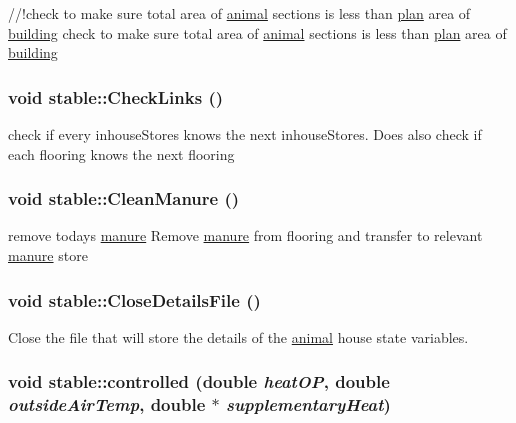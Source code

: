 //!check to make sure total area of \hyperlink{classanimal}{animal} sections is less than \hyperlink{classplan}{plan} area of \hyperlink{classbuilding}{building} check to make sure total area of \hyperlink{classanimal}{animal} sections is less than \hyperlink{classplan}{plan} area of \hyperlink{classbuilding}{building} \hypertarget{classstable_ab5d66f0a84fb3e73971682da583206e8}{
\subsubsection[{CheckLinks}]{\setlength{\rightskip}{0pt plus 5cm}void stable::CheckLinks ()}}
\label{classstable_ab5d66f0a84fb3e73971682da583206e8}
check if every inhouseStores knows the next inhouseStores. Does also check if each flooring knows the next flooring \hypertarget{classstable_a7aa89cb458e69d9f3e4c17edbeff7b81}{
\subsubsection[{CleanManure}]{\setlength{\rightskip}{0pt plus 5cm}void stable::CleanManure ()}}
\label{classstable_a7aa89cb458e69d9f3e4c17edbeff7b81}


remove todays \hyperlink{classmanure}{manure} Remove \hyperlink{classmanure}{manure} from flooring and transfer to relevant \hyperlink{classmanure}{manure} store \hypertarget{classstable_a13fcbf0229ba9f7ce566505f1ea23d5b}{
\subsubsection[{CloseDetailsFile}]{\setlength{\rightskip}{0pt plus 5cm}void stable::CloseDetailsFile ()}}
\label{classstable_a13fcbf0229ba9f7ce566505f1ea23d5b}


Close the file that will store the details of the \hyperlink{classanimal}{animal} house state variables. \hypertarget{classstable_a8cf231463ff53ad88d48885e5d063334}{
\subsubsection[{controlled}]{\setlength{\rightskip}{0pt plus 5cm}void stable::controlled (double {\em heatOP}, \/  double {\em outsideAirTemp}, \/  double $\ast$ {\em supplementaryHeat})}}
\label{classstable_a8cf231463ff53ad88d48885e5d063334}


